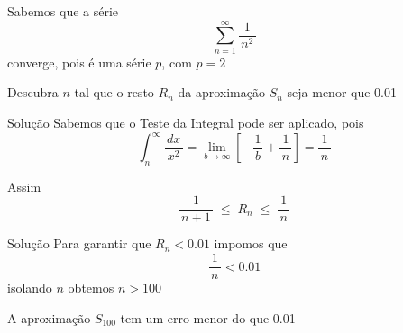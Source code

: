 \begin{question}
  Sabemos que a série
  \[
    \sum_{n=1}^\infty\frac{1}{\,n^2\,}
  \]
  converge, pois é uma série $p$, com $p=2$

  \vspace{\baselineskip}
  Descubra $n$ tal que o resto $R_n$ da aproximação $S_n$ seja menor que \num{0.01}
\end{question}

\begin{resolution}{Solução}
  Sabemos que o Teste da Integral pode ser aplicado, pois
  \[
    \int_n^\infty\frac{\,dx\,}{x^2}
    = \lim_{b\to\infty}\left[ -\frac{1}{\,b\,} + \frac{1}{\,n\,} \right]
    = \frac{1}{\,n\,}
  \]

  \pause
  \vspace{\baselineskip}
  Assim
  \[
    \frac{1}{\,n+1\,} \;\leq\; R_n \;\leq\; \frac{1}{\,n\,}
  \]
\end{resolution}

\begin{resolution}{Solução}
  Para garantir que $R_n<\num{0.01}$ impomos que
  \[
    \frac{1}{\,n\,} < \num{0.01}
  \]
  isolando $n$ obtemos $n>100$

  \pause
  \vspace{\baselineskip}
  A aproximação $S_{100}$ tem um erro menor do que \num{0.01}
\end{resolution}

